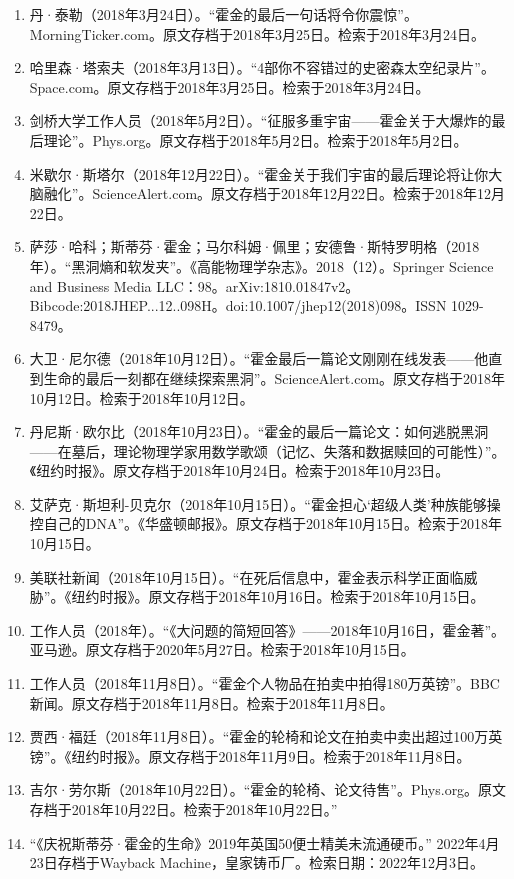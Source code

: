\begin{enumerate}
\item 丹·泰勒（2018年3月24日）。“霍金的最后一句话将令你震惊”。MorningTicker.com。原文存档于2018年3月25日。检索于2018年3月24日。
\item 哈里森·塔索夫（2018年3月13日）。“4部你不容错过的史密森太空纪录片”。Space.com。原文存档于2018年3月25日。检索于2018年3月24日。
\item 剑桥大学工作人员（2018年5月2日）。“征服多重宇宙——霍金关于大爆炸的最后理论”。Phys.org。原文存档于2018年5月2日。检索于2018年5月2日。
\item 米歇尔·斯塔尔（2018年12月22日）。“霍金关于我们宇宙的最后理论将让你大脑融化”。ScienceAlert.com。原文存档于2018年12月22日。检索于2018年12月22日。
\item 萨莎·哈科；斯蒂芬·霍金；马尔科姆·佩里；安德鲁·斯特罗明格（2018年）。“黑洞熵和软发夹”。《高能物理学杂志》。2018（12）。Springer Science and Business Media LLC：98。arXiv:1810.01847v2。Bibcode:2018JHEP...12..098H。doi:10.1007/jhep12(2018)098。ISSN 1029-8479。
\item 大卫·尼尔德（2018年10月12日）。“霍金最后一篇论文刚刚在线发表——他直到生命的最后一刻都在继续探索黑洞”。ScienceAlert.com。原文存档于2018年10月12日。检索于2018年10月12日。
\item 丹尼斯·欧尔比（2018年10月23日）。“霍金的最后一篇论文：如何逃脱黑洞——在墓后，理论物理学家用数学歌颂（记忆、失落和数据赎回的可能性）”。《纽约时报》。原文存档于2018年10月24日。检索于2018年10月23日。
\item 艾萨克·斯坦利-贝克尔（2018年10月15日）。“霍金担心‘超级人类’种族能够操控自己的DNA”。《华盛顿邮报》。原文存档于2018年10月15日。检索于2018年10月15日。
\item 美联社新闻（2018年10月15日）。“在死后信息中，霍金表示科学正面临威胁”。《纽约时报》。原文存档于2018年10月16日。检索于2018年10月15日。
\item 工作人员（2018年）。“《大问题的简短回答》——2018年10月16日，霍金著”。亚马逊。原文存档于2020年5月27日。检索于2018年10月15日。
\item 工作人员（2018年11月8日）。“霍金个人物品在拍卖中拍得180万英镑”。BBC新闻。原文存档于2018年11月8日。检索于2018年11月8日。
\item 贾西·福廷（2018年11月8日）。“霍金的轮椅和论文在拍卖中卖出超过100万英镑”。《纽约时报》。原文存档于2018年11月9日。检索于2018年11月8日。
\item 吉尔·劳尔斯（2018年10月22日）。“霍金的轮椅、论文待售”。Phys.org。原文存档于2018年10月22日。检索于2018年10月22日。”
\item “《庆祝斯蒂芬·霍金的生命》2019年英国50便士精美未流通硬币。” 2022年4月23日存档于Wayback Machine，皇家铸币厂。检索日期：2022年12月3日。

\end{enumerate}
